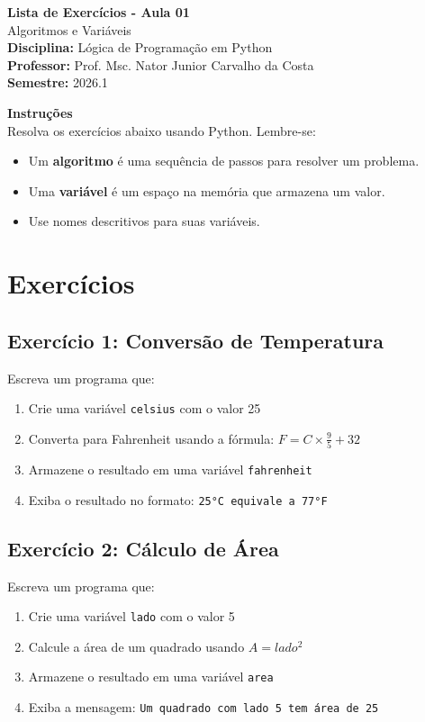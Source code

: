 \documentclass[12pt]{article}
\begin{document}
\begin{center}
{\LARGE \textbf{Lista de Exercícios - Aula 01}}\\[4pt]
{\large Algoritmos e Variáveis}\\[10pt]
\textbf{Disciplina:} Lógica de Programação em Python\\
\textbf{Professor:} Prof. Msc. Nator Junior Carvalho da Costa\\
\textbf{Semestre:} 2026.1
\end{center}

\vspace{8pt}
\colorbox{lightbg}{%
\parbox{\dimexpr\linewidth-2\fboxsep\relax}{%
\textbf{Instruções}\\
Resolva os exercícios abaixo usando Python. Lembre-se:
\begin{itemize}
    \item Um \textbf{algoritmo} é uma sequência de passos para resolver um problema.
    \item Uma \textbf{variável} é um espaço na memória que armazena um valor.
    \item Use nomes descritivos para suas variáveis.
\end{itemize}
}}

\section*{Exercícios}

\subsection*{Exercício 1: Conversão de Temperatura}
Escreva um programa que:
\begin{enumerate}
    \item Crie uma variável \texttt{celsius} com o valor 25
    \item Converta para Fahrenheit usando a fórmula: $F = C \times \frac{9}{5} + 32$
    \item Armazene o resultado em uma variável \texttt{fahrenheit}
    \item Exiba o resultado no formato: \texttt{25°C equivale a 77°F}
\end{enumerate}

\subsection*{Exercício 2: Cálculo de Área}
Escreva um programa que:
\begin{enumerate}
    \item Crie uma variável \texttt{lado} com o valor 5
    \item Calcule a área de um quadrado usando $A = lado^2$
    \item Armazene o resultado em uma variável \texttt{area}
    \item Exiba a mensagem: \texttt{Um quadrado com lado 5 tem área de 25}
\end{enumerate}
\end{document}
